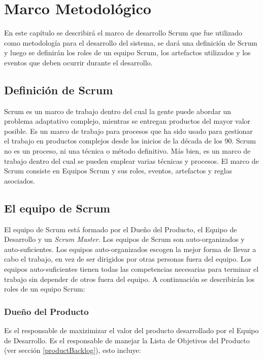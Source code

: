 \chapter{Marco Metodológico}

En este capítulo se describirá el marco de desarrollo Scrum que fue utilizado como metodología para el desarrollo del sistema, se dará una definición de Scrum y luego se definirán los roles de un equipo Scrum, los artefactos utilizados y los eventos que deben ocurrir durante el desarrollo.

\section{Definición de Scrum}
Scrum es un marco de trabajo dentro del cual la gente puede abordar un problema adaptativo complejo, mientras se entregan productos del mayor valor posible. Es un marco de trabajo para procesos que ha sido usado para gestionar el trabajo en productos complejos desde los inicios de la década de los 90. Scrum no es un proceso, ni una técnica o método definitivo. Más bien, es un marco de trabajo dentro del cual se pueden emplear varias técnicas y procesos. El marco de Scrum consiste en Equipos Scrum y sus roles, eventos, artefactos y reglas asociados. \cite{scrumSchwaber}

\section{El equipo de Scrum}
El equipo de Scrum está formado por el Dueño del Producto, el Equipo de Desarrollo y un \emph{Scrum Master}. Los equipos de Scrum son auto-organizados y auto-suficientes. Los equipos auto-organizados escogen la mejor forma de llevar a cabo el trabajo, en vez de ser dirigidos por otras personas fuera del equipo. Los equipos auto-suficientes tienen todas las competencias necesarias para terminar el trabajo sin depender de otros fuera del equipo. \cite{scrumSchwaber} A continuación se describirán los roles de un equipo Scrum:

\subsection{Dueño del Producto} \label{productOwner}
Es el responsable de maxizimizar el valor del producto desarrollado por el Equipo de Desarrollo. Es el responsable de manejar la Lista de Objetivos del Producto (ver sección \ref{productBacklog}), esto incluye:

